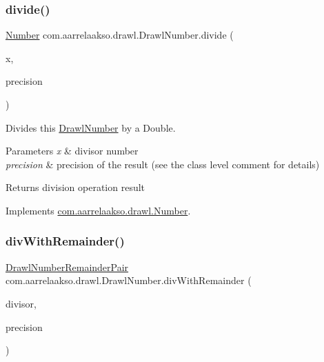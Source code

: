 \subsubsection{\texorpdfstring{divide()}{divide()}\hspace{0.1cm}{\footnotesize\ttfamily [3/3]}}
{\footnotesize\ttfamily \hyperlink{interfacecom_1_1aarrelaakso_1_1drawl_1_1_number}{Number} com.\+aarrelaakso.\+drawl.\+Drawl\+Number.\+divide (\begin{DoxyParamCaption}\item[{final double}]{x,  }\item[{final int}]{precision }\end{DoxyParamCaption})}



Divides this \hyperlink{classcom_1_1aarrelaakso_1_1drawl_1_1_drawl_number}{Drawl\+Number} by a Double. 


\begin{DoxyParams}{Parameters}
{\em x} & divisor number \\
\hline
{\em precision} & precision of the result (see the class level comment for details) \\
\hline
\end{DoxyParams}
\begin{DoxyReturn}{Returns}
division operation result 
\end{DoxyReturn}


Implements \hyperlink{interfacecom_1_1aarrelaakso_1_1drawl_1_1_number_aa4a70324e7a3dfd7da7fae72cb7fe5b5}{com.\+aarrelaakso.\+drawl.\+Number}.

\mbox{\label{classcom_1_1aarrelaakso_1_1drawl_1_1_drawl_number_a452c8b23180fe298592093adde0fa87e}} 
\subsubsection{\texorpdfstring{div\+With\+Remainder()}{divWithRemainder()}\hspace{0.1cm}{\footnotesize\ttfamily [1/2]}}
{\footnotesize\ttfamily \hyperlink{classcom_1_1aarrelaakso_1_1drawl_1_1_drawl_number_remainder_pair}{Drawl\+Number\+Remainder\+Pair} com.\+aarrelaakso.\+drawl.\+Drawl\+Number.\+div\+With\+Remainder (\begin{DoxyParamCaption}\item[{@Not\+Null final \hyperlink{interfacecom_1_1aarrelaakso_1_1drawl_1_1_number}{Number}}]{divisor,  }\item[{final int}]{precision }\end{DoxyParamCaption})}



